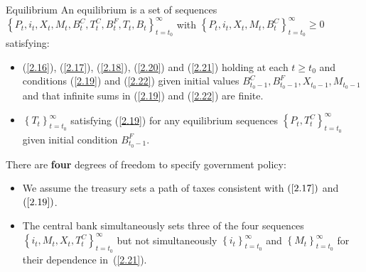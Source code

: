 \documentclass[11pt,aspectratio=169]{beamer}
\begin{document}
\begin{frame}{Equilibrium}
\small
An equilibrium is a set of sequences $\left\{P_t, i_t, X_t, M_t, B_t^C, T_t^C, B_t^F, T_t, B_t \right\}_{t=t_0}^\infty$ with $\left\{P_t, i_t, X_t, M_t, B_t^C\right\}_{t=t_0}^\infty\ge 0$ satisfying: 
\begin{itemize}
    \item (\ref{2.16}), (\ref{2.17}), (\ref{2.18}), (\ref{2.20}) and (\ref{2.21}) holding at each $t \ge t_0$ and conditions (\ref{2.19}) and (\ref{2.22}) given initial values $B_{t_0-1}^C, B_{t_0-1}^F, X_{t_0-1}, M_{t_0-1} $ and that infinite sums in (\ref{2.19}) and (\ref{2.22}) are finite.
    \item $\left\{T_t\right\}_{t=t_0}^\infty$ satisfying (\ref{2.19}) for any equilibrium sequences $\left\{P_t, T_t^C\right\}_{t=t_0}^\infty$ given initial condition $B_{t_0-1}^F$.
\end{itemize}
\vspace{0.25em}
There are \textbf{four} degrees of freedom to specify government policy: 
\begin{itemize}
    \item We assume the treasury sets a path of taxes consistent with $(\ref{2.17})$ and $(\ref{2.19})$.
    \item The central bank simultaneously sets three of the four sequences $\left\{i_t, M_t, X_t, T_t^C\right\}_{t=t_0}^\infty$ but not simultaneously $\left\{i_t\right\}_{t=t_0}^\infty$ and $\left\{M_t\right\}_{t=t_0}^\infty$ for their dependence in~(\ref{2.21}).
\end{itemize}


\end{frame}
\end{document}
